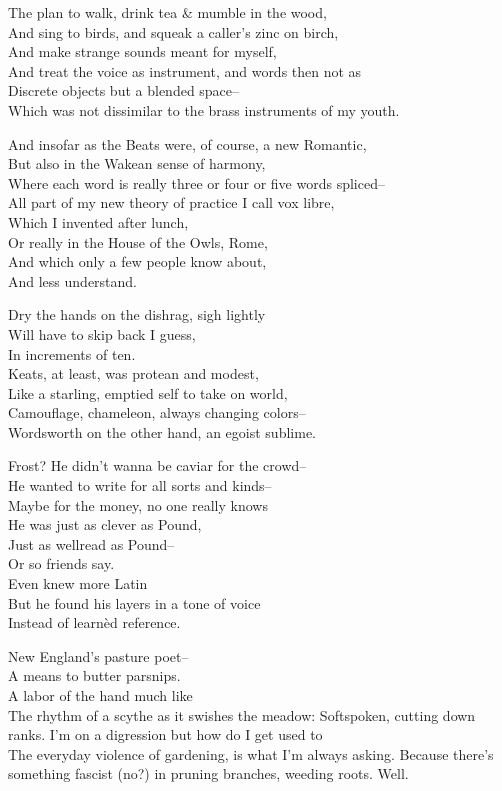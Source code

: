 The plan to walk, drink tea \& mumble in the wood, \\
And sing to birds, and squeak a caller's zinc on birch, \\
And make strange sounds meant for myself, \\
And treat the voice as instrument, and words then not as \\
Discrete objects but a blended space-- \\
Which was not dissimilar to the brass instruments of my youth.

And insofar as the Beats were, of course, a new Romantic, \\
But also in the Wakean sense of harmony, \\
Where each word is really three or four or five words spliced-- \\
All part of my new theory of practice I call vox libre, \\
Which I invented after lunch, \\
Or really in the House of the Owls, Rome, \\
And which only a few people know about, \\
And less understand.

Dry the hands on the dishrag, sigh lightly\\
Will have to skip back I guess, \\
In increments of ten. \\
Keats, at least, was protean and modest, \\
Like a starling, emptied self to take on world, \\
Camouflage, chameleon, always changing colors-- \\
Wordsworth on the other hand, an egoist sublime.

Frost? He didn't wanna be caviar for the crowd-- \\
He wanted to write for all sorts and kinds-- \\
Maybe for the money, no one really knows \\
He was just as clever as Pound, \\
Just as wellread as Pound-- \\
Or so friends say. \\
Even knew more Latin \\
But he found his layers in a tone of voice \\
Instead of learnèd reference.

New England's pasture poet-- \\
A means to butter parsnips. \\
A labor of the hand much like \\
The rhythm of a scythe as it swishes the meadow:
Softspoken, cutting down ranks. I'm on a digression but how do I get used to \\
The everyday violence of gardening, is what I'm always asking. Because there's something fascist (no?) in pruning branches, weeding roots. Well.


